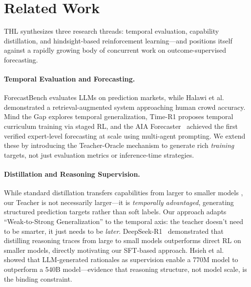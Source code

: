 \documentclass[11pt,a4paper]{article}
\begin{document}
\section{Related Work}

THL synthesizes three research threads: temporal evaluation, capability distillation, and hindsight-based reinforcement learning---and positions itself against a rapidly growing body of concurrent work on outcome-supervised forecasting.

\paragraph{Temporal Evaluation and Forecasting.}
ForecastBench \cite{karger2025forecastbench} evaluates LLMs on prediction markets, while Halawi et al.~\cite{halawi2024forecasting} demonstrated a retrieval-augmented system approaching human crowd accuracy. Mind the Gap \cite{lazaridou2021mind} explores temporal generalization, Time-R1 \cite{timer1_2025} proposes temporal curriculum training via staged RL, and the AIA Forecaster~\cite{aia2025} achieved the first verified expert-level forecasting at scale using multi-agent prompting. We extend these by introducing the Teacher-Oracle mechanism to generate rich \textit{training} targets, not just evaluation metrics or inference-time strategies.

\paragraph{Distillation and Reasoning Supervision.}
While standard distillation transfers capabilities from larger to smaller models \cite{hinton2015distilling}, our Teacher is not necessarily larger---it is \textit{temporally advantaged}, generating structured prediction targets rather than soft labels. Our approach adapts ``Weak-to-Strong Generalization'' \cite{burns2023weaktostrong} to the temporal axis: the teacher doesn't need to be smarter, it just needs to be \textit{later}. DeepSeek-R1~\cite{deepseekr1} demonstrated that distilling reasoning traces from large to small models outperforms direct RL on smaller models, directly motivating our SFT-based approach. Hsieh et al.~\cite{hsieh2023distilling} showed that LLM-generated rationales as supervision enable a 770M model to outperform a 540B model---evidence that reasoning structure, not model scale, is the binding constraint.
\end{document}
